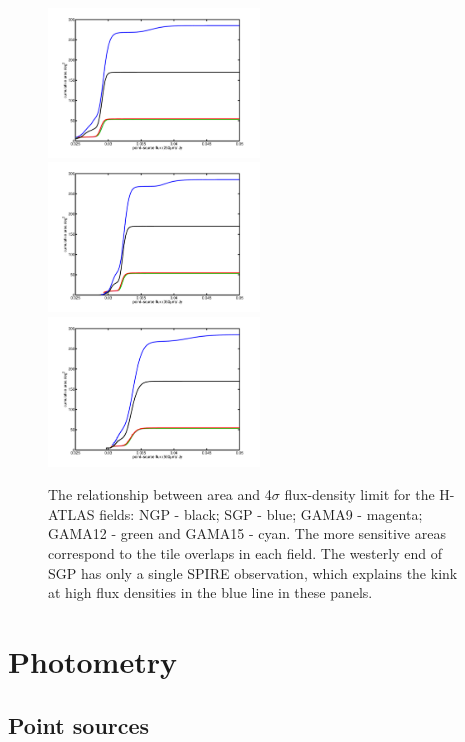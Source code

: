 \documentclass[a4paper,fleqn,usenatbib, twocolumn]{aastex61}
\begin{document}
\begin{figure} %
\includegraphics[width=0.5\textwidth]{flux_area_250.pdf}
\includegraphics[width=0.5\textwidth]{flux_area_350.pdf}
\includegraphics[width=0.5\textwidth]{flux_area_500.pdf}
\caption{The relationship between area and 4$\sigma$ flux-density
  limit for the H-ATLAS fields: NGP - black; SGP - blue; GAMA9 -
  magenta; GAMA12 - green and  GAMA15 - cyan.  The more sensitive areas
  correspond to the tile overlaps in each field.  The westerly end of
  SGP has only a single SPIRE observation, which explains the kink at
  high flux densities in the blue line in these panels.}

\label{fig_areas}
\end{figure}

\section{Photometry}

\subsection{Point sources}
\end{document}

